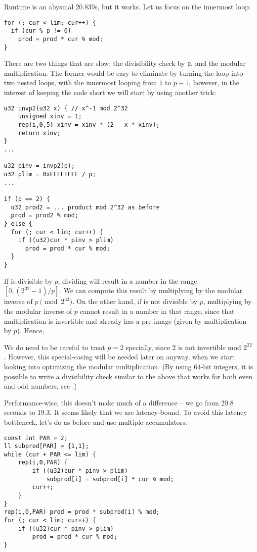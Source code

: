 Runtime is an abysmal 20.839s, but it works.
Let us focus on the innermost loop:
\begin{lstlisting}
for (; cur < lim; cur++) {
  if (cur % p != 0)
    prod = prod * cur % mod;
}
\end{lstlisting}

There are two things that are slow: the divisibility check by \texttt{p}, and the modular multiplication.
The former would be easy to eliminate by turning the loop into two nested loops, with the innermost looping from $1$ to $p-1$, however, in the interest of keeping the code short we will start by using another trick:

\begin{lstlisting}
u32 invp2(u32 x) { // x^-1 mod 2^32
	unsigned xinv = 1;
	rep(i,0,5) xinv = xinv * (2 - x * xinv);
	return xinv;
}
...

u32 pinv = invp2(p);
u32 plim = 0xFFFFFFFF / p;
...

if (p == 2) {
  u32 prod2 = ... product mod 2^32 as before
  prod = prod2 % mod;
} else {
  for (; cur < lim; cur++) {
    if ((u32)cur * pinv > plim)
      prod = prod * cur % mod;
  }
}
\end{lstlisting}

If \verb@cur@ is divisible by $p$, dividing will result in a number in the range $[0, (2^{32}-1) / p]$.
We can compute this result by multiplying by the modular inverse of $p \pmod{2^{32}}$.
On the other hand, if \verb@cur@ is not divisible by $p$, multiplying by the modular inverse of $p$ cannot result in a number in that range, since that multiplication is invertible and already has a pre-image (given by multiplication by $p$).
Hence, \verb@cur % p == 0@ can be replaced by \verb@(u32)cur * pinv <= plim@, multiplication being a much cheaper operation than modulo.

We do need to be careful to treat $p = 2$ specially, since 2 is not invertible mod $2^{32}$.
However, this special-casing will be needed later on anyway, when we start looking into optimizing the modular multiplication. (By using 64-bit integers, it is possible to write a divisibility check similar to the above that works for both even and odd numbers, see \cite{fastdivcheck}.)

Performance-wise, this doesn't make much of a difference -- we go from 20.8 seconds to 19.3.
It seems likely that we are latency-bound.
To avoid this latency bottleneck, let's do as before and use multiple accumulators:

\begin{lstlisting}
const int PAR = 2;
ll subprod[PAR] = {1,1};
while (cur + PAR <= lim) {
	rep(i,0,PAR) {
		if ((u32)cur * pinv > plim)
			subprod[i] = subprod[i] * cur % mod;
		cur++;
	}
}
rep(i,0,PAR) prod = prod * subprod[i] % mod;
for (; cur < lim; cur++) {
	if ((u32)cur * pinv > plim)
		prod = prod * cur % mod;
}
\end{lstlisting}

